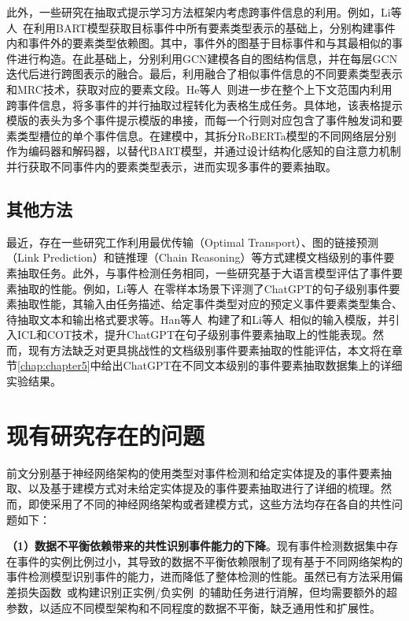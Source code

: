 此外，一些研究在抽取式提示学习方法框架内考虑跨事件信息的利用。例如，Li等人~\cite{li2023intra}在利用BART模型获取目标事件中所有要素类型表示的基础上，分别构建事件内和事件外的要素类型依赖图。其中，事件外的图基于目标事件和与其最相似的事件进行构造。在此基础上，分别利用GCN建模各自的图结构信息，并在每层GCN迭代后进行跨图表示的融合。最后，利用融合了相似事件信息的不同要素类型表示和MRC技术，获取对应的要素文段。He等人~\cite{he2023revisiting}则进一步在整个上下文范围内利用跨事件信息，将多事件的并行抽取过程转化为表格生成任务。具体地，该表格提示模版的表头为多个事件提示模版的串接，而每一个行则对应包含了事件触发词和要素类型槽位的单个事件信息。在建模中，其拆分RoBERTa模型的不同网络层分别作为编码器和解码器，以替代BART模型，并通过设计结构化感知的自注意力机制并行获取不同事件内的要素类型表示，进而实现多事件的要素抽取。

\subsection{其他方法}

最近，存在一些研究工作利用最优传输（Optimal Transport）\cite{veyseh2022document}、图的链接预测（Link Prediction）\cite{yang2023amr}和链推理（Chain Reasoning）\cite{liu2023document}等方式建模文档级别的事件要素抽取任务。此外，与事件检测任务相同，一些研究基于大语言模型评估了事件要素抽取的性能。例如，Li等人~\cite{li2023evaluating}在零样本场景下评测了ChatGPT的句子级别事件要素抽取性能，其输入由任务描述、给定事件类型对应的预定义事件要素类型集合、待抽取文本和输出格式要求等。Han等人~\cite{han2023information}构建了和Li等人~\cite{li2023evaluating}相似的输入模版，并引入ICL和COT技术，提升ChatGPT在句子级别事件要素抽取上的性能表现。然而，现有方法缺乏对更具挑战性的文档级别事件要素抽取的性能评估，本文将在章节\ref{chap:chapter5}中给出ChatGPT在不同文本级别的事件要素抽取数据集上的详细实验结果。

\section{现有研究存在的问题}

前文分别基于神经网络架构的使用类型对事件检测和给定实体提及的事件要素抽取、以及基于建模方式对未给定实体提及的事件要素抽取进行了详细的梳理。然而，即使采用了不同的神经网络架构或者建模方式，这些方法均存在各自的共性问题如下：

\textbf{（1）数据不平衡依赖带来的共性识别事件能力的下降}。现有事件检测数据集中存在事件的实例比例过小，其导致的数据不平衡依赖限制了现有基于不同网络架构的事件检测模型识别事件的能力，进而降低了整体检测的性能。虽然已有方法采用偏差损失函数~\cite{chen2018collective,yan2019event,cui2020edge}或构建识别正实例/负实例~\cite{ye2019exploiting}的辅助任务进行消解，但均需要额外的超参数，以适应不同模型架构和不同程度的数据不平衡，缺乏通用性和扩展性。

